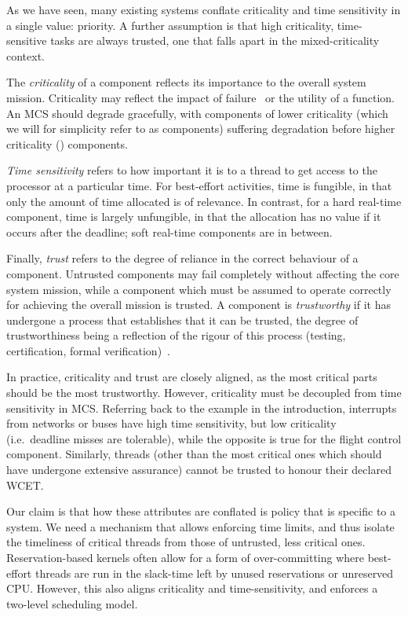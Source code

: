 As we have seen, many existing systems conflate criticality and time sensitivity 
in a single value: priority. A further assumption is that high criticality, time-sensitive tasks are
always trusted, one that falls apart in the mixed-criticality context. 

The \emph{criticality} of a component reflects its importance to the
overall system mission.
Criticality may reflect the impact of failure~\citep{ARINC653} or the
utility of a function. An MCS should degrade gracefully, with
components of lower criticality (which we will for simplicity refer to
as  components) suffering degradation before higher
criticality () components.

\emph{Time sensitivity} refers to how important it is to a thread to
get access to the processor at a particular time. For best-effort activities, time is
fungible, in that only the amount of time allocated is of
relevance. In contrast, for a hard real-time component, time is
largely unfungible, in that the allocation has no value if it occurs after
the deadline; soft real-time components are in between.

Finally, \emph{trust} refers to the degree of reliance in the correct
behaviour of a component. Untrusted components may fail completely
without affecting the core system mission, while a component which
must be assumed to operate correctly for achieving the overall mission
is trusted. A component is \emph{trustworthy} if it has undergone a process
that establishes that it can be trusted, the degree of trustworthiness
being a reflection of the rigour of this process (testing,
certification, formal verification)~\citep{Verissimo_NC_03}.

In practice, criticality and trust are closely aligned, as the most
critical parts should be the most trustworthy.
However, criticality must be decoupled from time sensitivity in MCS.
Referring back to the
example in the introduction, interrupts from networks or buses have
high time sensitivity, but low criticality (i.e.\ deadline misses are
tolerable), while the opposite is true for the flight control component.
Similarly, threads (other than the most critical ones which should
have undergone extensive assurance) cannot be
trusted to honour their declared WCET.

Our claim is that how these attributes are conflated is
policy that is specific to a system.
We need a mechanism that allows  enforcing time limits, and thus
isolate the timeliness of critical threads from those of untrusted,
less critical ones.
Reservation-based kernels often allow for a form of over-committing where
best-effort threads are run in the slack-time left by unused reservations or unreserved CPU.
However, this also aligns criticality and time-sensitivity, and
enforces a two-level scheduling model.

